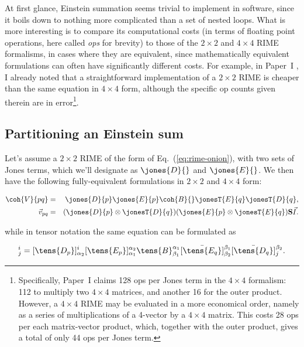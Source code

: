 At first glance, Einstein summation seems trivial to implement in software, since it boils down to nothing more complicated than a set of nested loops. What is more interesting is to compare its computational costs (in terms of floating point operations, here called \emph{ops} for brevity) to those of the $2\times2$ and $4\times4$ RIME formalisms, in cases where they
are equivalent, since mathematically equivalent formulations can often have significantly different costs. For example, in Paper~I \citep[Sect.~6.1]{RRIME1}, I already noted that a straightforward implementation of a $2\times2$ RIME is cheaper than the same equation in $4\times4$ form, although the specific op counts given therein are in error\footnote{Specifically, Paper~I claims 128 ops per Jones term in the $4\times4$ formalism: 112 to multiply two $4\times4$ matrices, and another 16 for the outer product. However, a $4\times4$ RIME may be evaluated in a more economical order, namely as a series of multiplications of a 4-vector by a $4\times4$ matrix. This costs 28 ops per each matrix-vector product, which, together with the outer product, gives a total of only 44 ops per Jones term.}.

\subsection{Partitioning an Einstein sum}

Let's assume a $2\times2$ RIME of the form of Eq.~(\ref{eq:rime-onion}), with two sets of Jones terms, which we'll designate as $\jones{D}{}$ and $\jones{E}{}$. We then have the following fully-equivalent formulations in $2\times2$ and $4\times4$ form:

\begin{eqnarray}
\label{eq:example-2x2}
  \coh{V}{pq} &=& \jones{D}{p}\jones{E}{p} \coh{B}{} \jonesT{E}{q} \jonesT{D}{q}, \\
\label{eq:example-4x4}
  \vec v_{pq} &=& (\jones{D}{p}\otimes\jonesT{D}{q})(\jones{E}{p}\otimes\jonesT{E}{q})
              \mathbf{S}{} \vec I.
\end{eqnarray}

while in tensor notation the same equation can be formulated as

\begin{equation}
  [\tens{V_{pq}}]^i_j = 
  [\tens{D_p}]^{i}_{\alpha_2} 
  [\tens{E_p}]^{\alpha_2}_{\alpha_1} 
  \tens{B}^{\alpha_1}_{\beta_1}
  [\bar\tens{E_q}]^{\beta_1}_{\beta_2}  
  [\bar\tens{D_q}]^{\beta_2}_{j}.
\label{eq:tensor-onion}
\end{equation}

